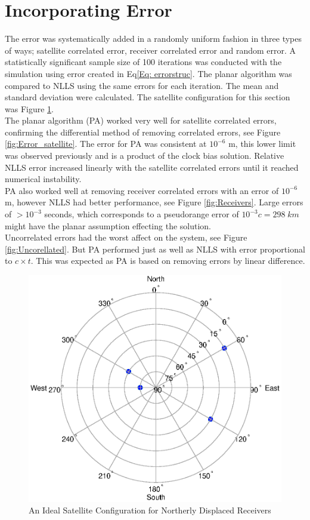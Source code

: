 
\section{Incorporating Error}
The error was systematically added in a randomly uniform fashion in three types of ways; satellite correlated error, receiver correlated error and random error. A statistically significant sample size of 100 iterations was conducted with the simulation using error created in Eq\eqref{Eq: errorstruc}. The planar algorithm was compared to NLLS using the same errors for each iteration. The mean and standard deviation were calculated. The satellite configuration for this section was Figure \ref{fig:satconfig_1m}.\\

The planar algorithm (PA) worked very well for satellite correlated errors, confirming the differential method of removing correlated errors, see Figure \ref{fig:Error_satellite}. The error for PA was consistent at $10^{-6}$ m, this lower limit was observed previously and is a product of the clock bias solution. Relative NLLS error increased linearly with the satellite correlated errors until it reached numerical instability.\\

PA also worked well at removing receiver correlated errors with an error of $10^{-6}$ m, however NLLS had better performance, see Figure \ref{fig:Receivers}. Large errors of $>10^{-3}$ seconds, which corresponds to a pseudorange error of $10^{-3}c = 298\; km$ might have the planar assumption effecting the solution.\\

Uncorrelated errors had the worst affect on the system, see Figure \ref{fig:Uncorellated}. But PA performed just as well as NLLS with error proportional to $c\times t$. This was expected as PA is based on removing errors by linear difference.

\begin{figure}
\centering
\caption{An Ideal Satellite Configuration for Northerly Displaced Receivers}
\label{fig:satconfig_1m}
\includegraphics[width=0.7\linewidth]{ChapterExperiments/Figures/ControlledError/satconfig_1m}
\end{figure}


